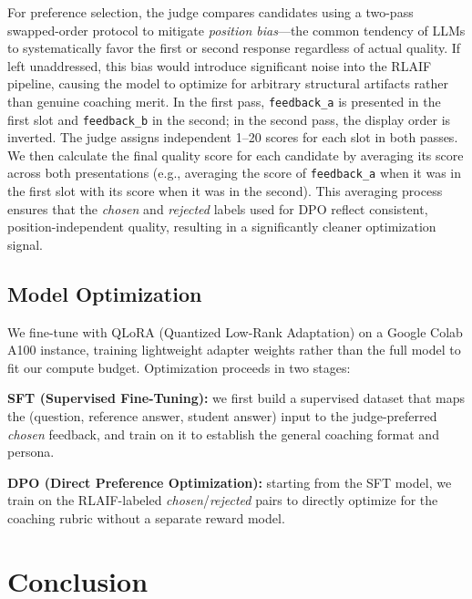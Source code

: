 \documentclass[10pt,twocolumn,letterpaper]{article}
\begin{document}
For preference selection, the judge compares candidates using a two-pass swapped-order protocol to mitigate \emph{position bias}---the common tendency of LLMs to systematically favor the first or second response regardless of actual quality. If left unaddressed, this bias would introduce significant noise into the RLAIF pipeline, causing the model to optimize for arbitrary structural artifacts rather than genuine coaching merit. In the first pass, \texttt{feedback\_a} is presented in the first slot and \texttt{feedback\_b} in the second; in the second pass, the display order is inverted. The judge assigns independent 1--20 scores for each slot in both passes. We then calculate the final quality score for each candidate by averaging its score across both presentations (e.g., averaging the score of \texttt{feedback\_a} when it was in the first slot with its score when it was in the second). This averaging process ensures that the \textit{chosen} and \textit{rejected} labels used for DPO reflect consistent, position-independent quality, resulting in a significantly cleaner optimization signal.

\subsection{Model Optimization}
We fine-tune with QLoRA (Quantized Low-Rank Adaptation) on a Google Colab A100 instance, training lightweight adapter weights rather than the full model to fit our compute budget. Optimization proceeds in two stages:
\begin{compactenum}
    \item \textbf{SFT (Supervised Fine-Tuning):} we first build a supervised dataset that maps the (question, reference answer, student answer) input to the judge-preferred \textit{chosen} feedback, and train on it to establish the general coaching format and persona.
    \item \textbf{DPO (Direct Preference Optimization):} starting from the SFT model, we train on the RLAIF-labeled \textit{chosen}/\textit{rejected} pairs to directly optimize for the coaching rubric without a separate reward model.
\end{compactenum}



\section{Conclusion}
\label{sec:conclusion}
\end{document}
